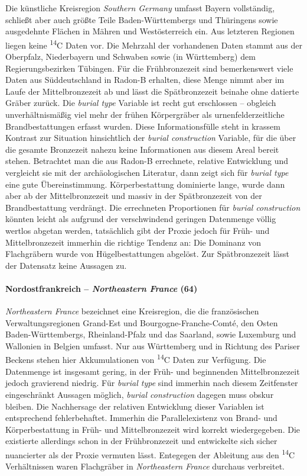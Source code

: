 \documentclass[openany,twoside,twocolumn]{book}
\begin{document}
Die künstliche Kreisregion \emph{Southern Germany} umfasst Bayern
vollständig, schließt aber auch größte Teile Baden-Württembergs und
Thüringens sowie ausgedehnte Flächen in Mähren und Westösterreich ein.
Aus letzteren Regionen liegen keine \textsuperscript{14}C Daten vor. Die
Mehrzahl der vorhandenen Daten stammt aus der Oberpfalz, Niederbayern
und Schwaben sowie (in Württemberg) dem Regierungsbezirken Tübingen. Für
die Frühbronzezeit sind bemerkenswert viele Daten aus Süddeutschland in
Radon-B erhalten, diese Menge nimmt aber im Laufe der Mittelbronzezeit
ab und lässt die Spätbronzezeit beinahe ohne datierte Gräber zurück. Die
\emph{burial type} Variable ist recht gut erschlossen -- obgleich
unverhältnismäßig viel mehr der frühen Körpergräber als
urnenfelderzeitliche Brandbestattungen erfasst wurden. Diese
Informationsfülle steht in krassem Kontrast zur Situation hinsichtlich
der \emph{burial construction} Variable, für die über die gesamte
Bronzezeit nahezu keine Informationen aus diesem Areal bereit stehen.
Betrachtet man die aus Radon-B errechnete, relative Entwicklung und
vergleicht sie mit der archäologischen Literatur, dann zeigt sich für
\emph{burial type} eine gute Übereinstimmung. Körperbestattung
dominierte lange, wurde dann aber ab der Mittelbronzezeit und massiv in
der Spätbronzezeit von der Brandbestattung verdrängt. Die errechneten
Proportionen für \emph{burial construction} könnten leicht als aufgrund
der verschwindend geringen Datenmenge völlig wertlos abgetan werden,
tatsächlich gibt der Proxie jedoch für Früh- und Mittelbronzezeit
immerhin die richtige Tendenz an: Die Dominanz von Flachgräbern wurde
von Hügelbestattungen abgelöst. Zur Spätbronzezeit lässt der Datensatz
keine Aussagen zu.

\hypertarget{nordostfrankreich-northeastern-france-64}{%
\paragraph{\texorpdfstring{Nordostfrankreich -- \emph{Northeastern
France}
(64)}{Nordostfrankreich -- Northeastern France (64)}}\label{nordostfrankreich-northeastern-france-64}}

\emph{Northeastern France} bezeichnet eine Kreisregion, die die
französischen Verwaltungsregionen Grand-Est und Bourgogne-Franche-Comté,
den Osten Baden-Württembergs, Rheinland-Pfalz und das Saarland, sowie
Luxemburg und Wallonien in Belgien umfasst. Nur aus Württemberg und in
Richtung des Pariser Beckens stehen hier Akkumulationen von
\textsuperscript{14}C Daten zur Verfügung. Die Datenmenge ist insgesamt
gering, in der Früh- und beginnenden Mittelbronzezeit jedoch gravierend
niedrig. Für \emph{burial type} sind immerhin nach diesem Zeitfenster
eingeschränkt Aussagen möglich, \emph{burial construction} dagegen muss
obskur bleiben. Die Nachhersage der relativen Entwicklung dieser
Variablen ist entsprechend fehlerbehaftet. Immerhin die Parallelexistenz
von Brand- und Körperbestattung in Früh- und Mittelbronzezeit wird
korrekt wiedergegeben. Die existierte allerdings schon in der
Frühbronzezeit und entwickelte sich sicher nuancierter als der Proxie
vermuten lässt. Entegegen der Ableitung aus den \textsuperscript{14}C
Verhältnissen waren Flachgräber in \emph{Northeastern France} durchaus
verbreitet.
\end{document}
